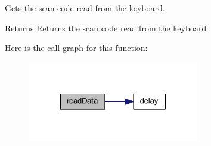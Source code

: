 Gets the scan code read from the keyboard. 

\begin{DoxyReturn}{Returns}
Returns the scan code read from the keyboard 
\end{DoxyReturn}
Here is the call graph for this function\+:
\nopagebreak
\begin{figure}[H]
\begin{center}
\leavevmode
\includegraphics[width=212pt]{group___keyboard_ga7038ddb0c35ef732a786679094a9de0e_cgraph}
\end{center}
\end{figure}

